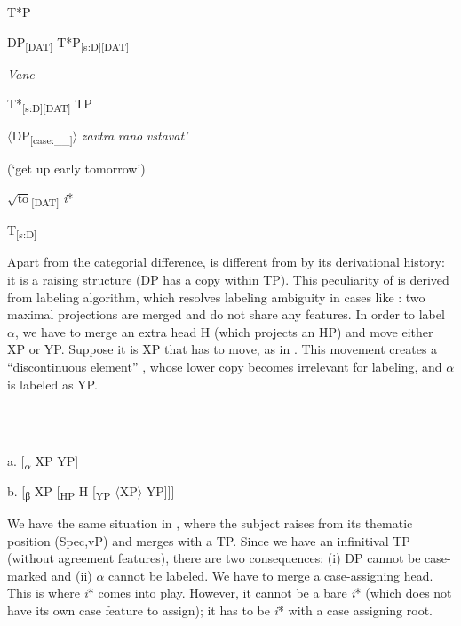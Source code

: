 \documentclass[output=paper,modfonts,nonflat]{langsci/langscibook}
\begin{document}
          T*P

  DP\textsubscript{[DAT]}  T*P\textsubscript{[s:D][DAT]}

  \textit{Vane}

    T*\textsubscript{[s:D][DAT]}  TP

      ${\langle}$DP\textsubscript{[case:\_\_]}${\rangle}$ \textit{zavtra} \textit{rano} \textit{vstavat’} 

      (‘get up early tomorrow’)  

   $\sqrt{\text{to}}$\textsubscript{[DAT]}  \textit{i}*        

      T\textsubscript{[s:D]}

Apart from the categorial difference,  is different from  by its derivational history: it is a raising structure (DP has a copy within TP). This peculiarity of  is derived from  labeling algorithm, which resolves labeling ambiguity in cases like : two maximal projections are merged and do not share any features. In order to label ${\alpha}$, we have to merge an extra head H (which projects an HP) and move either XP or YP. Suppose it is XP that has to move, as in . This movement creates a “discontinuous element” \citep[44]{Chomsky2013}, whose lower copy becomes irrelevant for labeling, and ${\alpha}$ is labeled as YP. 

\ea%
    \label{ex:key:32}
    \gll\\
        \\
    \glt
    \z

          a.  [\textsubscript{${\alpha}$} XP YP]

  b.  [\textsubscript{β} XP [\textsubscript{HP} H [\textsubscript{YP} ${\langle}$XP${\rangle}$ YP]]]

We have the same situation in , where the subject raises from its thematic position (Spec,vP) and merges with a TP. Since we have an infinitival TP (without agreement features), there are two consequences: (i) DP cannot be case-marked and (ii) ${\alpha}$ cannot be labeled. We have to merge a case-assigning head. This is where \textit{i}* comes into play. However, it cannot be a bare \textit{i}* (which does not have its own case feature to assign); it has to be \textit{i}* with a case assigning root. 

\ea%
    \label{ex:key:33}
    \gll\\
        \\
    \glt
    \z
\end{document}
